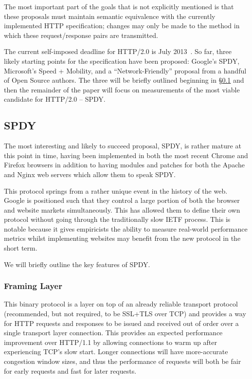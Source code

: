 \documentclass[10pt,letterpaper,notitlepage]{article}
\begin{document}
The most important part of the goals that is not explicitly mentioned is that
these proposals must maintain semantic equivalence with the currently
implemented HTTP specification; changes may only be made to the method in
which these request/response pairs are transmitted.

The current self-imposed deadline for HTTP/2.0 is July
2013~\cite{httpbis-charter}.  So far, three likely starting points for
the specification have been proposed: Google's SPDY, Microsoft's Speed +
Mobility, and a ``Network-Friendly'' proposal from a handful of Open Source
authors. The three will be briefly outlined beginning in
\S\ref{sec:background/spdy} and then the remainder of the paper will focus on
measurements of the most viable candidate for HTTP/2.0 -- SPDY.

\subsection{SPDY}
\label{sec:background/spdy}
The most interesting and likely to succeed proposal, SPDY, is rather mature
at this point in time, having been implemented in both the most recent Chrome
and Firefox browsers in addition to having modules and patches for both the
Apache and Nginx web servers which allow them to speak SPDY.

This protocol springs from a rather unique event in the history of the web.
Google is positioned such that they control a large portion of both the browser
and website markets simultaneously. This has allowed them to define their own
protocol without going through the traditionally slow IETF process. This is
notable because it gives empiricists the ability to measure real-world
performance metrics whilst implementing websites may benefit from the new
protocol in the short term.

We will briefly outline the key features of SPDY.

\subsubsection{Framing Layer}
This binary protocol is a layer on top of an already reliable transport
protocol (recommended, but not required, to be SSL+TLS over TCP) and provides a
way for HTTP requests and responses to be issued and received out of order over
a single transport layer connection.  This provides an expected performance
improvement over HTTP/1.1 by allowing connections to warm up after experiencing
TCP's slow start. Longer connections will have more-accurate congestion window
sizes, and thus the performance of requests will both be fair for early
requests and fast for later requests.
\end{document}

